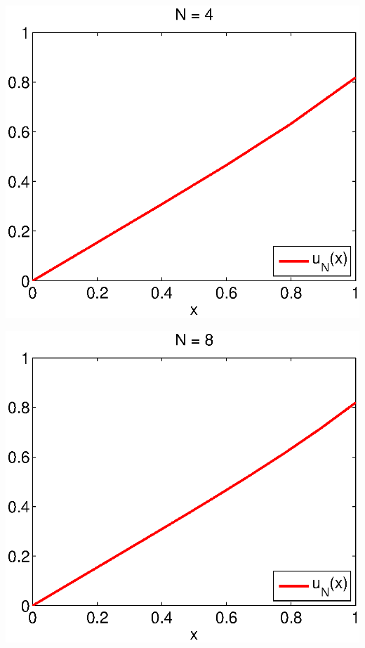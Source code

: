 {\begin{solution}
\begin{enumerate}
\begin{center}\includegraphics[scale=0.7]{hw92d4.eps}\end{center}
\begin{center}\includegraphics[scale=0.7]{hw92d8.eps}\end{center}

\end{enumerate}
\end{solution}}

